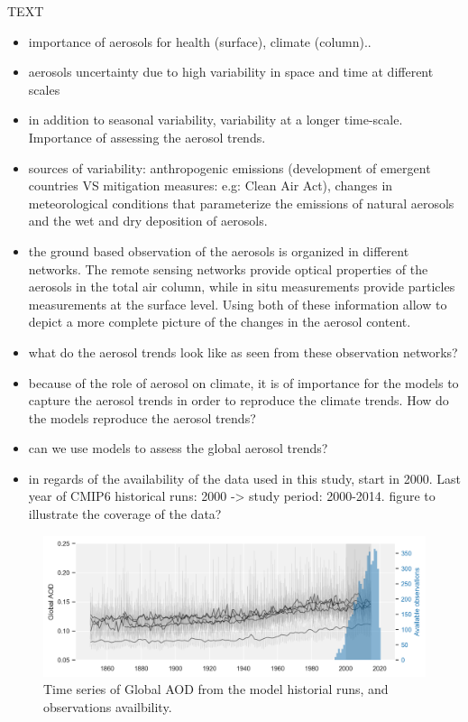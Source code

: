 \documentclass[journal abbreviation, manuscript]{copernicus}
\begin{document}
\introduction  %
TEXT
\begin{itemize}
 \item importance of aerosols for health (surface), climate (column)..
 \item aerosols uncertainty due to high variability in space and time at different scales
 \item in addition to seasonal variability, variability at a longer time-scale. Importance of assessing the aerosol trends.
 \item sources of variability: anthropogenic emissions (development of emergent countries VS mitigation measures: e.g: Clean Air Act), changes in meteorological conditions that parameterize the emissions of natural aerosols and the wet and dry deposition of aerosols.
 \item the ground based observation of the aerosols is organized in different networks. The remote sensing networks provide optical properties of the aerosols in the total air column, while in situ measurements provide particles measurements at the surface level. Using both of these information allow to depict a more complete picture of the changes in the aerosol content.
 \item what do the aerosol trends look like as seen from these observation networks?
 \item because of the role of aerosol on climate, it is of importance for the models to capture the aerosol trends in order to reproduce the climate trends. How do the models reproduce the aerosol trends?
 \item can we use models to assess the global aerosol trends?
 \item in regards of the availability of the data used in this study, start in 2000. Last year of CMIP6 historical runs: 2000 -> study period: 2000-2014.
 figure to illustrate the coverage of the data?
\end{itemize}

\begin{figure}
    \centering
    \includegraphics[width=12cm]{../scripts/figs/hist_runs.png}
    \caption{Time series of Global AOD from the model historial runs, and observations availbility.}
    \label{fig:hist_runs}
\end{figure}
\end{document}
